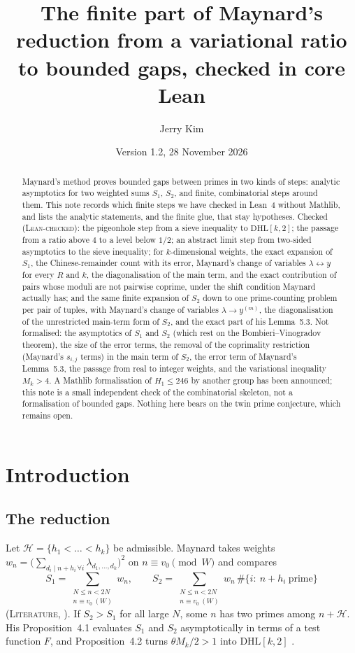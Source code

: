 \documentclass[11pt]{amsart}
\title[The finite part of Maynard's reduction in core Lean]{The finite part of Maynard's reduction from a variational ratio to bounded gaps, checked in core Lean}
\author{Jerry Kim}
\date{Version 1.2, 28 November 2026}
\theoremstyle{definition}
\theoremstyle{remark}
\newcommand{\lbl}[1]{\textup{\textsc{#1}}}
\newcommand{\DHL}{\mathrm{DHL}}
\begin{document}
\begin{abstract}
Maynard's method proves bounded gaps between primes in two kinds of steps:
analytic asymptotics for two weighted sums $S_1$, $S_2$, and finite,
combinatorial steps around them. This note records which finite steps we
have checked in Lean~4 without Mathlib, and lists the analytic statements, and the finite glue, that stay hypotheses. Checked (\lbl{Lean-checked}): the pigeonhole
step from a sieve inequality to $\DHL[k,2]$; the passage from a ratio above
$4$ to a level below $1/2$; an abstract limit step from two-sided asymptotics to
the sieve inequality; for $k$-dimensional weights, the exact expansion of
$S_1$, the Chinese-remainder count with its error, Maynard's change of
variables $\lambda\leftrightarrow y$ for every $R$ and $k$, the
diagonalisation of the main term, and the exact contribution of pairs whose
moduli are not pairwise coprime, under the shift condition Maynard actually has; and the
same finite expansion of $S_2$ down to one prime-counting problem per pair of tuples, with
Maynard's change of variables $\lambda\to y^{(m)}$, the diagonalisation of the
unrestricted main-term form of $S_2$, and the exact part of his Lemma~5.3. Not formalised: the asymptotics of $S_1$ and
$S_2$ (which rest on the Bombieri--Vinogradov theorem), the size of the error
terms, the removal of the coprimality restriction (Maynard's $s_{i,j}$ terms) in the main term of $S_2$, the error term of Maynard's Lemma~5.3, the passage from real to integer
weights, and the variational inequality $M_k>4$. A Mathlib formalisation of
$H_1\le246$ by another group has been announced; this
note is a small independent check of the combinatorial skeleton, not a
formalisation of bounded gaps. Nothing here bears on the twin prime
conjecture, which remains open.
\end{abstract}

\maketitle
\setcounter{tocdepth}{1}
\tableofcontents

\section{Introduction}

\subsection*{The reduction}
Let $\mathcal H=\{h_1<\dots<h_k\}$ be admissible. Maynard \cite{May15} takes
weights $w_n=\big(\sum_{d_i\mid n+h_i\,\forall i}\lambda_{d_1,\dots,d_k}\big)^2$ on
$n\equiv v_0\pmod W$ and compares
\[
S_1=\sum_{\substack{N\le n<2N\\ n\equiv v_0\ (W)}} w_n,\qquad
S_2=\sum_{\substack{N\le n<2N\\ n\equiv v_0\ (W)}} w_n\,\#\{i:\ n+h_i\ \text{prime}\}
\]
(\lbl{Literature}, \cite[(4.2)--(4.3)]{May15}). If $S_2>S_1$ for all large $N$, some
$n$ has two primes among $n+\mathcal H$. His Proposition~4.1 evaluates $S_1$ and
$S_2$ asymptotically in terms of a test function $F$, and Proposition~4.2
turns $\theta M_k/2>1$ into $\DHL[k,2]$ \cite[pp.~5--6 of arXiv v3]{May15}.
\end{document}
